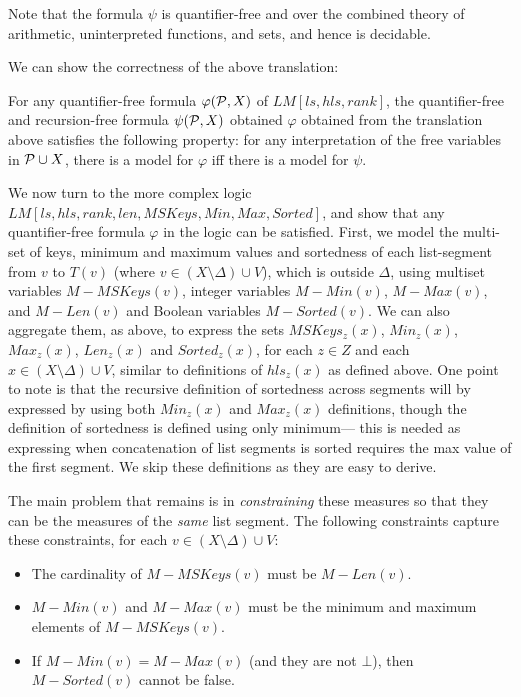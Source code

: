 Note that the formula $\psi$ is quantifier-free and over the combined theory of arithmetic, uninterpreted functions, and sets, and hence is decidable. 

We can show the correctness of the above translation:
\begin{lemma}
	For any quantifier-free formula $\varphi({\cal P}, X)$ of $LM[ls,hls,rank]$, the quantifier-free and recursion-free
	 formula $\psi({\cal P}, X)$ obtained $\varphi$ obtained from the translation above
	 satisfies the following property: for any interpretation of the free variables
    in ${\cal P} \cup X$, there is a model for $\varphi$ iff there is a model for $\psi$.
\end{lemma}

\bigskip

We now turn to the more complex logic $LM[ls, hls, rank, len, MSKeys, Min, Max, Sorted]$, and show that
any quantifier-free formula $\varphi$ in the logic can be satisfied. First, we model the multi-set
of keys, minimum and maximum values and sortedness of each list-segment from $v$ to $T(v)$ 
(where $v \in (X \setminus \Delta) \cup V$),
which is outside $\Delta$, using multiset variables $M-MSKeys(v)$, integer variables $M-Min(v)$, $M-Max(v)$,
and $M-Len(v)$ and Boolean variables $M-Sorted(v)$.
We can also aggregate them, as above, to express the sets $MSKeys_z(x)$, $Min_z(x)$, $Max_z(x)$, $Len_z(x)$
and $Sorted_z(x)$, for each $z \in Z$ and
each $x \in (X \setminus \Delta) \cup V$, similar to definitions of $hls_z(x)$ as defined above.
One point to note is that the recursive definition of sortedness across segments will by expressed
by using both $Min_z(x)$ and $Max_z(x)$ definitions, though the definition of sortedness is defined
using only minimum--- this is needed as expressing when concatenation of list segments is sorted
requires the max value of the first segment. We skip these definitions as they are easy to derive.

The main problem that remains is in \emph{constraining} these measures so that they can be the measures
of the \emph{same} list segment. The following constraints capture these constraints, for each 
$v \in (X \setminus \Delta) \cup V$:
\begin{itemize}
	\item The cardinality of $M-MSKeys(v)$ must be $M-Len(v)$.
	\item $M-Min(v)$ and $M-Max(v)$ must be the minimum and maximum elements of $M-MSKeys(v)$.
	\item If $M-Min(v)=M-Max(v)$ (and they are not $\bot$), then $M-Sorted(v)$ cannot be false.
\end{itemize}

